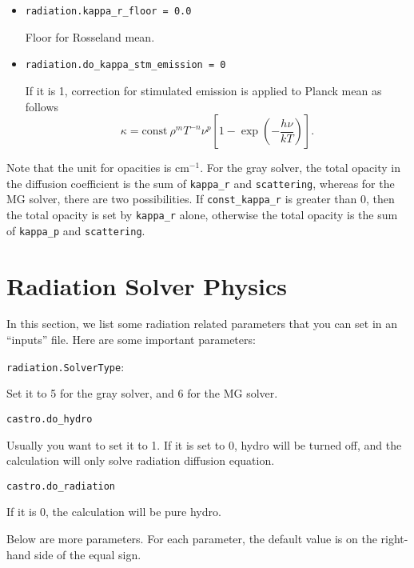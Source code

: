 \documentclass[11pt,letterpaper]{article}
\begin{document}
\begin{itemize}
\item {\tt radiation.kappa\_r\_floor = 0.0}

  Floor for Rosseland mean.

\item{\tt radiation.do\_kappa\_stm\_emission = 0}

  If it is 1, correction for stimulated emission is applied to Planck mean as
  follows
  \begin{equation}
    \kappa = \mathrm{const}\ \rho^{m} T^{-n} \nu^{p}
    \left [1-\exp{\left (-\frac{h\nu}{k T} \right )} \right ].
  \end{equation}
\end{itemize}

\noindent Note that the unit for opacities is $\mathrm{cm}^{-1}$.  For
the gray solver, the total opacity in the diffusion coefficient is the sum
of {\tt kappa\_r} and {\tt scattering}, whereas for the MG solver,
there are two possibilities.  If {\tt const\_kappa\_r} is greater than
0, then the total opacity is set by {\tt kappa\_r} alone, otherwise
the total opacity is the sum of {\tt kappa\_p} and {\tt scattering}.



\section{Radiation Solver Physics}

In this section, we list some radiation related parameters that you
can set in an ``inputs'' file.  Here are some important parameters:
\begin{description}
\item {\tt radiation.SolverType}:

  Set it to 5 for the gray solver, and 6 for the MG solver.

\item {\tt castro.do\_hydro}

  Usually you want to set it to 1.  If it is set to 0, hydro will be
  turned off, and the calculation will only solve radiation diffusion
  equation.

\item {\tt castro.do\_radiation}

  If it is 0, the calculation will be pure hydro.
\end{description}

Below are more parameters.  For each parameter, the default value is
on the right-hand side of the equal sign.
\end{document}
